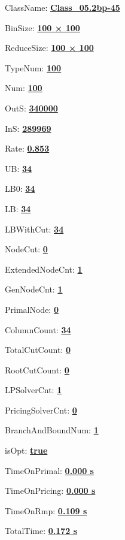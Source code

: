 \documentclass[11pt]{article}
\begin{document}
\pagestyle{empty}


ClassName: \underline{\textbf{Class_05.2bp-45}}
\par
BinSize: \underline{\textbf{100 × 100}}
\par
ReduceSize: \underline{\textbf{100 × 100}}
\par
TypeNum: \underline{\textbf{100}}
\par
Num: \underline{\textbf{100}}
\par
OutS: \underline{\textbf{340000}}
\par
InS: \underline{\textbf{289969}}
\par
Rate: \underline{\textbf{0.853}}
\par
UB: \underline{\textbf{34}}
\par
LB0: \underline{\textbf{34}}
\par
LB: \underline{\textbf{34}}
\par
LBWithCut: \underline{\textbf{34}}
\par
NodeCut: \underline{\textbf{0}}
\par
ExtendedNodeCnt: \underline{\textbf{1}}
\par
GenNodeCnt: \underline{\textbf{1}}
\par
PrimalNode: \underline{\textbf{0}}
\par
ColumnCount: \underline{\textbf{34}}
\par
TotalCutCount: \underline{\textbf{0}}
\par
RootCutCount: \underline{\textbf{0}}
\par
LPSolverCnt: \underline{\textbf{1}}
\par
PricingSolverCnt: \underline{\textbf{0}}
\par
BranchAndBoundNum: \underline{\textbf{1}}
\par
isOpt: \underline{\textbf{true}}
\par
TimeOnPrimal: \underline{\textbf{0.000 s}}
\par
TimeOnPricing: \underline{\textbf{0.000 s}}
\par
TimeOnRmp: \underline{\textbf{0.109 s}}
\par
TotalTime: \underline{\textbf{0.172 s}}
\par
\newpage


\end{document}
